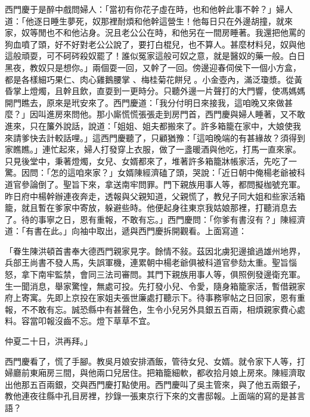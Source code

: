 西門慶于是醉中戲問婦人：「當初有你花子虛在時，也和他幹此事不幹？」婦人道：「他逐日睡生夢死，奴那裡耐煩和他幹這營生！他每日只在外邊胡撞，就來家，奴等閒也不和他沾身。況且老公公在時，和他另在一間房睡著。我還把他罵的狗血噴了頭，好不好對老公公說了，要打白棍兒，也不算人。甚麼材料兒，奴與他這般頑耍，可不砢硶殺奴罷了！誰似冤家這般可奴之意，就是醫奴的藥一般。白日黑夜，教奴只是想你。」兩個耍一回，又幹了一回。傍邊迎春伺侯下一個小方盒，都是各樣細巧果仁、肉心雞鵝腰掌 、梅桂菊花餅兒 。小金壺內，滿泛瓊漿。從黃昏掌上燈燭，且幹且飲，直耍到一更時分。只聽外邊一片聲打的大門響，使馮媽媽開門瞧去，原來是玳安來了。西門慶道：「我分付明日來接我，這咱晚又來做甚麼？」因叫進房來問他。那小廝慌慌張張走到房門首，西門慶與婦人睡著，又不敢進來，只在簾外說話，說道：「姐姐、姐夫都搬來了。許多箱籠在家中，大娘使我來請爹快去計較話哩。」這西門慶聽了，只顧猶豫：「這咱晚端的有甚緣故？須得到家瞧瞧。」連忙起來，婦人打發穿上衣服，做了一盞暖酒與他吃，打馬一直來家。只見後堂中，秉著燈燭，女兒、女婿都來了，堆著許多箱籠牀帳家活，先吃了一驚。因問：「怎的這咱來家？」女婿陳經濟磕了頭，哭說：「近日朝中俺楊老爺被科道官參論倒了。聖旨下來，拿送南牢問罪。門下親族用事人等，都問擬枷號充軍。昨日府中楊幹辦連夜奔走，透報與父親知道，父親慌了，教兒子同大姐和些家活箱籠，就且暫在爹家中寄放，躲避些時。他便起身往東京我姑娘那裡，打聽消息去了。待的事寧之日，恩有重報，不敢有忘。」西門慶問：「你爹有書沒有？」陳經濟道：「有書在此。」向袖中取出，遞與西門慶拆開觀看。上面寫道：

「眷生陳洪頓首書奉大德西門親家見字。餘情不敍。茲因北虜犯邊搶過雄州地界，兵部王尚書不發人馬，失誤軍機，連累朝中楊老爺俱被科道官參劾太重。聖旨惱怒，拿下南牢監禁，會同三法司審問。其門下親族用事人等，俱照例發邊衛充軍。生一聞消息，舉家驚惶，無處可投。先打發小兒、令愛，隨身箱籠家活，暫借親家府上寄寓。先即上京投在家姐夫張世廉處打聽示下。待事務寧帖之日回家，恩有重報，不不敢有忘。誠恐縣中有甚聲色，生令小兒另外具銀五百兩，相煩親家費心處料。容當叩報沒齒不忘。燈下草草不宜。

仲夏二十日，洪再拜。」

西門慶看了，慌了手腳。教吳月娘安排酒飯，管待女兒、女婿。就令家下人等，打婦廳前東廂房三間，與他兩口兒居住。把箱籠細軟，都收拾月娘上房來。陳經濟取出他那五百兩銀，交與西門慶打點使用。西門慶叫了吳主管來，與了他五兩銀子，教他連夜往縣中孔目房裡，抄錄一張東京行下來的文書邸報。上面端的寫的是甚言語？

